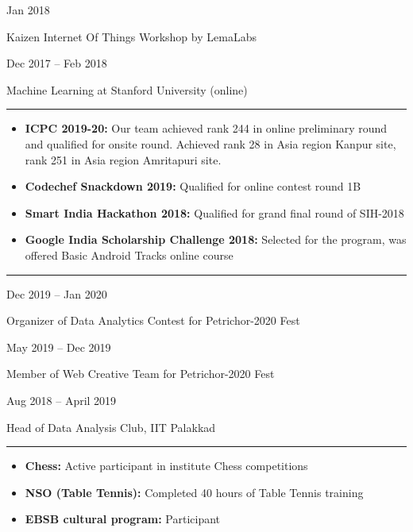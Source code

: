 \documentclass[a4paper,10pt]{article}
\newlength{\cvcolumngapwidth}
\newlength{\cvleftcolumnwidth}
\newlength{\cvrightcolumnwidth}
\newcommand{\cvsectionstyle}[1]{{\normalsize\cvsectionfont\textcolor{cvsectioncolor}{#1}}}
\newcommand{\cvtitlestyle}[1]{{\large\cvtitlefont\textcolor{cvtitlecolor}{#1}}}
\newcommand{\cvdurationstyle}[1]{{\small\cvdurationfont\textcolor{cvdurationcolor}{#1}}}
\newcommand{\cvheadingstyle}[1]{{\normalsize\cvheadingfont\textcolor{cvheadingcolor}{#1}}}
\newlength{\cvafteritemskipamount}
\newlength{\cvaftersectionskipamount}
\newlength{\cvbetweensectionandheadingextraskipamount}
\newlength{\cvaftertitleskipamount}
\newlength{\cvparskip}
\newcommand{\cvsection}[1]{
    \begin{minipage}[t]{\cvleftcolumnwidth}
        \raggedleft\cvsectionstyle{#1}
    \end{minipage}%
    \hspace{\cvcolumngapwidth}%
    \begin{minipage}[t]{\cvrightcolumnwidth}
        \textcolor{cvrulecolor}{\rule{\cvrightcolumnwidth}{0.3mm}}
    \end{minipage}

    \vspace{\cvaftersectionskipamount}
}
\newcommand{\cvitem}[2]{
    \begin{minipage}[t]{\cvleftcolumnwidth}
        \raggedleft #1
    \end{minipage}%
    \hspace{\cvcolumngapwidth}%
    \begin{minipage}[t]{\cvrightcolumnwidth}
        \setlength{\parskip}{\cvparskip} #2
    \end{minipage}

    \vspace{\cvafteritemskipamount}
}
\newcommand{\cvtitle}[1]{
    \cvtitlestyle{#1}

    \vspace{\cvaftertitleskipamount}
    \vspace{-\cvparskip}
}
\begin{document}
\cvitem{
    \cvdurationstyle{Jan 2018}
}{
    \cvtitle{Kaizen Internet Of Things Workshop by LemaLabs}
}

\cvitem{
    \cvdurationstyle{Dec 2017 -- Feb 2018}
}{
    \cvtitle{Machine Learning at Stanford University (online)}
}



\cvsection{ACHIEVEMENTS}

\vspace{\cvbetweensectionandheadingextraskipamount}

\cvitem{
    \cvheadingstyle{}
}{
    
    \begin{itemize}
        \item \textbf{ICPC 2019-20:} Our team achieved rank 244 in online preliminary round and qualified for onsite round. Achieved rank 28 in Asia region Kanpur site, rank 251 in Asia region Amritapuri site.
        \item \textbf{Codechef Snackdown 2019:} Qualified for online contest round 1B
        \item \textbf{Smart India Hackathon 2018:} Qualified for grand final round of SIH-2018
        \item \textbf{Google India Scholarship Challenge 2018:} Selected for the program, was offered Basic Android Tracks online course
        
    \end{itemize}

    
}

\cvsection{POSITION OF RESPONSIBILITIES}

\vspace{\cvbetweensectionandheadingextraskipamount}

\cvitem{
    \cvdurationstyle{Dec 2019 -- Jan 2020}
}{
    \cvtitle{Organizer of Data Analytics Contest for Petrichor-2020 Fest}
}

\cvitem{
    \cvdurationstyle{May 2019 -- Dec 2019}
}{
    \cvtitle{Member of Web Creative Team for Petrichor-2020 Fest}
}

\cvitem{
    \cvdurationstyle{Aug 2018 -- April 2019}
}{
    \cvtitle{Head of Data Analysis Club, IIT Palakkad}
}


\cvsection{EXTRACURRICULAR ACTIVITIES}

\vspace{\cvbetweensectionandheadingextraskipamount}

\cvitem{
    \cvheadingstyle{}
}{
    
    \begin{itemize}
        \item \textbf{Chess:} Active participant in institute Chess competitions
        \item \textbf{NSO (Table Tennis):} Completed 40 hours of Table Tennis training
        \item \textbf{EBSB cultural program:} Participant
        
    \end{itemize}

    
}
\end{document}
